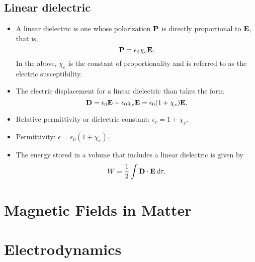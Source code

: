 \documentclass[11pt]{article}
\begin{document}
\subsection{Linear dielectric}
\begin{itemize}
    \item A linear dielectric is one whose polarization $\mathbf{P}$ is directly proportional to $\mathbf{E}$, that is,
    \begin{equation}
        \mathbf{P} = \epsilon_0 \chi_e \mathbf{E}.
    \end{equation}
    In the above, $\chi_e$ is the constant of proportionality and is referred to as the electric susceptibility.
    \item The electric displacement for a linear dielectric than takes the form
    \begin{equation}
        \mathbf{D} = \epsilon_0 \mathbf{E} + \epsilon_0 \chi_e \mathbf{E} = \epsilon_0 (1 + \chi_e) \mathbf{E}.
    \end{equation}
    \item Relative permittivity or dielectric constant: $\epsilon_r = 1 + \chi_e$.
    \item Permittivity: $\epsilon = \epsilon_0 (1 + \chi_e)$.
    \item The energy stored in a volume that includes a linear dielectric is given by
    \begin{equation}
        W = \frac{1}{2} \int \mathbf{D} \cdot \mathbf{E} \, d\tau.
    \end{equation}
\end{itemize}


\section{Magnetic Fields in Matter}

\section{Electrodynamics}

\end{document}
